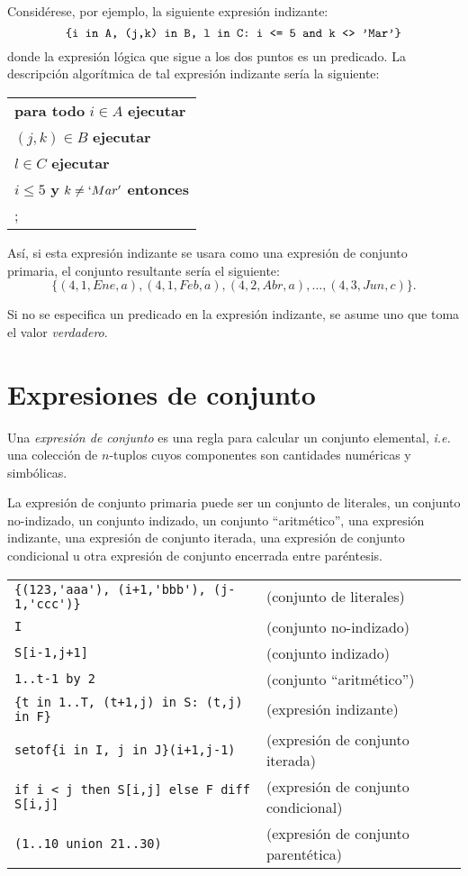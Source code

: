 \documentclass[11pt,spanish]{report}
\def\para#1{\noindent{\bf#1}}
\begin{document}
Considérese, por ejemplo, la siguiente expresión indizante:
$$\mbox{{\tt\{i in A, (j,k) in B, l in C: i <= 5 and k <> 'Mar'\}}}$$
donde la expresión lógica que sigue a los dos puntos es un predicado. La descripción algorítmica de tal expresión indizante sería la siguiente:

\noindent\hfil
\begin{tabular}{@{}l@{}}
{\bf para todo} $i\in A$ {\bf ejecutar}\\
\hspace{16pt}{\bf para todo} $(j,k)\in B$ {\bf ejecutar}\\
\hspace{32pt}{\bf para todo} $l\in C$ {\bf ejecutar}\\
\hspace{48pt}{\bf si} $i\leq 5$ {\bf y} $k\neq`Mar'$ {\bf entonces}\\
\hspace{64pt}{\it acción};\\
\end{tabular}

\noindent Así, si esta expresión indizante se usara como una expresión de conjunto primaria, el conjunto resultante sería el siguiente:
$$\{(4,1,Ene,a),(4,1,Feb,a),(4,2,Abr,a),\dots,(4,3,Jun,c)\}.$$

Si no se especifica un predicado en la expresión indizante, se asume uno que toma el valor {\it verdadero}.

\section{Expresiones de conjunto}

Una {\it expresión de conjunto} es una regla para calcular un conjunto elemental, {\it i.e.} una colección de $n$-tuplos cuyos componentes son cantidades numéricas y simbólicas.

La expresión de conjunto primaria puede ser un conjunto de literales, un conjunto no-indizado, un conjunto indizado, un conjunto ``aritmético'', una expresión indizante, una expresión de conjunto iterada, una expresión de conjunto condicional u otra expresión de conjunto encerrada entre paréntesis.

\para{Ejemplos}

\noindent
\begin{tabular}{@{}ll@{}}
\verb|{(123,'aaa'), (i+1,'bbb'), (j-1,'ccc')}| &(conjunto de literales)\\
\verb|I| &(conjunto no-indizado)\\
\verb|S[i-1,j+1]| &(conjunto indizado)\\
\verb|1..t-1 by 2| &(conjunto ``aritmético'')\\
\verb|{t in 1..T, (t+1,j) in S: (t,j) in F}| &(expresión indizante)\\
\verb|setof{i in I, j in J}(i+1,j-1)| &(expresión de conjunto iterada)\\
\verb|if i < j then S[i,j] else F diff S[i,j]| &(expresión de conjunto condicional)\\
\verb|(1..10 union 21..30)| &(expresión de conjunto parentética)\\
\end{tabular}
\end{document}
